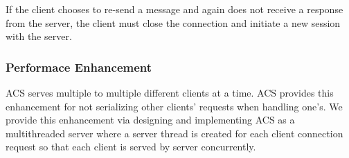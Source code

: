 If the client chooses to re-send a message and again does not receive a response from the server, the client must close the connection and initiate a new session with the server.

\subsubsection{Performace Enhancement}
ACS serves multiple to multiple different clients at a time. ACS provides this enhancement for not serializing other clients' requests when handling one's. We provide this enhancement via designing and implementing ACS as a multithreaded server where a server thread is created for each client connection request so that each client is served by server concurrently.
